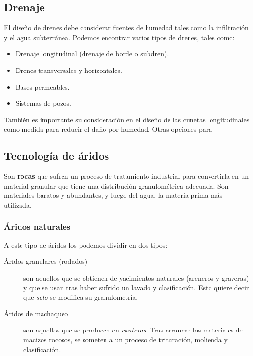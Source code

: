 \documentclass[../main.tex]{subfiles}
\begin{document}
\subsection{Drenaje}

El diseño de drenes debe considerar fuentes de humedad tales como la 
infiltración y el agua subterránea. Podemos encontrar varios tipos de drenes,
tales como:

\begin{itemize}
  \item Drenaje longitudinal (drenaje de borde o subdren).
  \item Drenes transversales y horizontales.
  \item Bases permeables.
  \item Sistemas de pozos.
\end{itemize}

También es importante su consideración en el diseño de las cunetas 
longitudinales como medida para reducir el daño por humedad. Otras opciones para


\subsection{Tecnología de áridos}

Son \textbf{rocas} que sufren un proceso de tratamiento industrial para
convertirla en un material granular que tiene una distribución granulométrica
adecuada. Son materiales baratos y abundantes, y luego del agua, la materia
prima más utilizada.

\subsubsection{Áridos naturales}

A este tipo de áridos los podemos dividir en dos tipos:

\begin{description}
  \item[Áridos granulares (rodados)] son aquellos que se obtienen de yacimientos
    naturales (areneros y graveras) y que se usan tras haber sufrido un lavado y
    clasificación. Esto quiere decir que \textit{solo} se modifica su granulometría.

  \item[Áridos de machaqueo] son aquellos que se producen en \textit{canteras}.
    Tras arrancar los materiales de macizos rocosos, se someten a un proceso
    de trituración, molienda y clasificación. 
\end{description}
\end{document}
